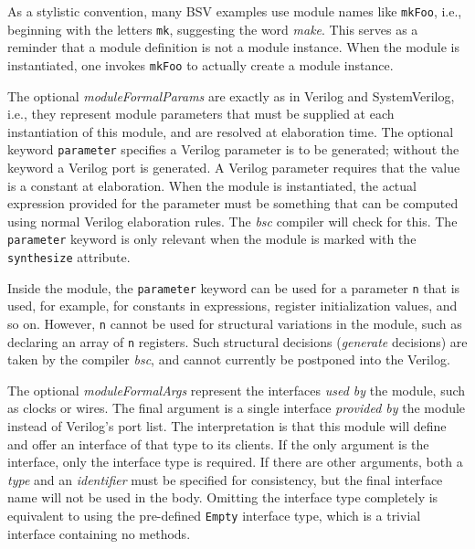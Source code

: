 \documentclass[twoside,letterpaper]{article}
\newcommand{\BSV}{BSV}
\newcommand{\bsc}{\emph{bsc}}
\newcommand{\SV}{SystemVerilog}
\newcommand{\V}{Verilog}
\newcommand{\te}[1]{\texttt{#1}}
\newcommand{\nterm}[1]{\emph{#1}}
\newcommand{\term}[1]{\texttt{#1}}
\begin{document}
As a stylistic convention, many {\BSV} examples use module names like
\texttt{mkFoo}, i.e., beginning with the letters \texttt{mk}, suggesting the
word \emph{make}.  This serves as a reminder that a module definition
is not a module instance.  When the module is instantiated, one
invokes \texttt{mkFoo} to actually create a module instance.

The optional \nterm{moduleFormalParams} are exactly as in {\V} and
{\SV}, i.e., they represent module parameters that must be supplied at
each instantiation of this module, and are resolved at elaboration
time.  The optional keyword \term{parameter} specifies a {\V}
parameter is to be generated; without the keyword a
{\V} port is generated.  A {\V} parameter requires that the value is a
constant at elaboration.  When the module is instantiated, the actual
expression provided for the parameter must be something that can be
computed using normal Verilog elaboration rules.  The {\bsc} compiler
will check for this.  The \term{parameter} keyword is only relevant
when the module is marked with the \te{synthesize} attribute.

Inside the module, the \te{parameter} keyword can be used for a
parameter \te{n} that is used, for example, for constants in
expressions, register initialization values, and so on.  However,
\te{n} cannot be used for structural variations in the module, such as
declaring an array of \te{n} registers.  Such structural decisions
({\em generate} decisions) are taken by the compiler {\bsc}, and
cannot currently be postponed into the Verilog.




 


The optional
\nterm{moduleFormalArgs} represent the interfaces \emph{used by} the
module, such as clocks or wires.  The final argument is 
 a single interface \emph{provided by} the module
instead of {\V}'s port list.  The
interpretation is that this module will define and offer an interface
of that type to its clients.  If the only argument is the interface,
only the interface type is required.  If there are other arguments, both a
\nterm{type} and an \nterm{identifier} must be specified for
consistency, but the final interface name  will not be
used in the body.  
Omitting the interface type completely is
equivalent to using the pre-defined \texttt{Empty} interface type, which
is a trivial interface containing no methods.
\end{document}
